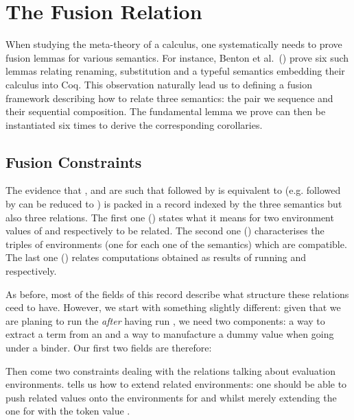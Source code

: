 \chapter{The Fusion Relation}

When studying the meta-theory of a calculus, one systematically needs to prove
fusion lemmas for various semantics. For instance, Benton et al.~(\citeyear{benton2012strongly})
prove six such lemmas relating renaming, substitution and a typeful semantics
embedding their calculus into Coq. This observation naturally lead us to
defining a fusion framework describing how to relate three semantics: the pair
we sequence and their sequential composition. The fundamental lemma we prove
can then be instantiated six times to derive the corresponding corollaries.

\section{Fusion Constraints}

The evidence that ,  and  are such that  followed
by  is equivalent to  (e.g.  followed by 
can be reduced to ) is packed in a record  indexed by the
three semantics but also three relations. The first one () states what it means
for two environment values of  and  respectively to be related. The
second one () characterises the triples of environments (one for each one of
the semantics) which are compatible. The last one () relates computations
obtained as results of running  and  respectively.


As before, most of the fields of this record describe what structure these relations
ceed to have. However, we start with something slightly different: given that we are
planing to run the   \emph{after} having run , we need
two components: a way to extract a term from an  and a way to manufacture a
dummy  value when going under a binder. Our first two fields are therefore:


Then come two constraints dealing with the relations talking about evaluation environments.
 tells us how to extend related environments: one should be able to push related
values onto the environments for  and  whilst merely extending the one
for  with the token value .

